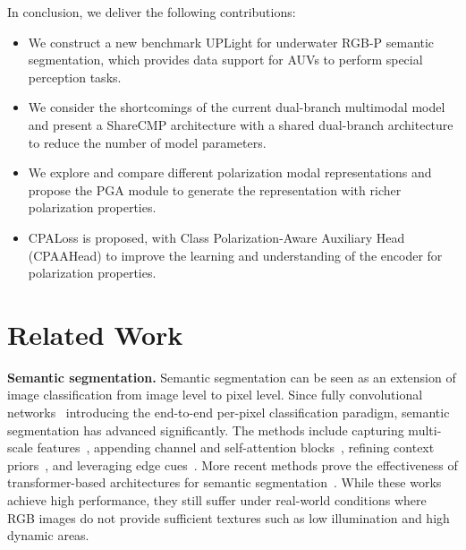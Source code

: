 \documentclass[10pt,twocolumn,letterpaper]{article}
\begin{document}
In conclusion, we deliver the following contributions:
\begin{itemize}
    \item We construct a new benchmark UPLight for underwater RGB-P semantic segmentation, which provides data support for AUVs to perform special perception tasks.
    \item We consider the shortcomings of the current dual-branch multimodal model and present a ShareCMP architecture with a shared dual-branch architecture to reduce the number of model parameters.
    \item We explore and compare different polarization modal representations and propose the PGA module to generate the representation with richer polarization properties.
    \item CPALoss is proposed, with Class Polarization-Aware Auxiliary Head (CPAAHead) to improve the learning and understanding of the encoder for polarization properties.
\end{itemize} \section{Related Work}
\label{sec:related_work}


\medskip
\noindent
\textbf{Semantic segmentation.}
Semantic segmentation can be seen as an extension of image classification from image level to pixel level. Since fully convolutional networks~\cite{6} introducing the end-to-end per-pixel classification paradigm, semantic segmentation has advanced significantly. The methods include capturing multi-scale features~\cite{7,8,9,10}, appending channel and self-attention blocks~\cite{11,12,13,14}, refining context priors~\cite{15,16,17,18}, and leveraging edge cues~\cite{19,20,21,22}. More recent methods prove the effectiveness of transformer-based architectures for semantic segmentation~\cite{23,24,25,26}. While these works achieve high performance, they still suffer under real-world conditions where RGB images do not provide sufficient textures such as low illumination and high dynamic areas.
\end{document}
